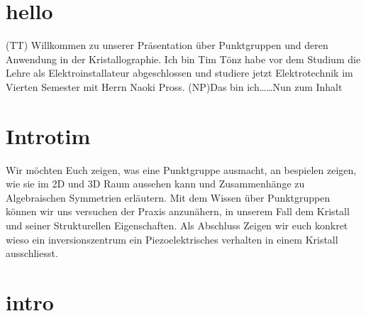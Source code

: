 \documentclass[a4paper]{article}
\begin{document}
\section{hello}
(TT) Willkommen zu unserer Präsentation über Punktgruppen und deren Anwendung in der Kristallographie. 
Ich bin Tim Tönz habe vor dem Studium die Lehre als Elektroinstallateur abgeschlossen und studiere jetzt Elektrotechnik im Vierten Semester mit Herrn Naoki Pross. 
(NP)Das bin ich\ldots   \ldots  Nun zum Inhalt 

\section{Introtim}
Wir möchten Euch zeigen, was eine Punktgruppe ausmacht, an bespielen zeigen, wie sie im 2D und 3D Raum aussehen kann und Zusammenhänge zu Algebraischen Symmetrien erläutern. 
Mit dem Wissen über Punktgruppen können wir uns versuchen der Praxis anzunähern, in unserem Fall dem Kristall und seiner Strukturellen Eigenschaften.  
Als Abschluss Zeigen wir euch konkret wieso ein inversionszentrum ein Piezoelektrisches verhalten in einem Kristall ausschliesst.

\section{intro}
\end{document}
